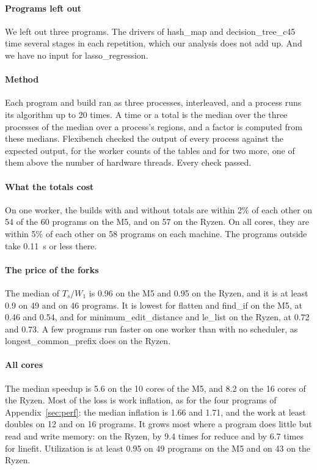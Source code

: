 \documentclass[sigplan,nonacm]{acmart}
\begin{document}
\paragraph{Programs left out}
%
We left out three programs.
%
The drivers of hash\_map and decision\_tree\_c45 time several stages
in each repetition, which our analysis does not add up.
%
And we have no input for lasso\_regression.

\paragraph{Method}
%
Each program and build ran as three processes, interleaved, and a
process runs its algorithm up to 20 times.
%
A time or a total is the median over the three processes of the median
over a process's regions, and a factor is computed from these medians.
%
Flexibench checked the output of every process against the expected
output, for the worker counts of the tables and for two more, one of
them above the number of hardware threads.
%
Every check passed.

\paragraph{What the totals cost}
%
On one worker, the builds with and without totals are within 2\% of
each other on 54 of the 60 programs on the M5, and on 57 on the Ryzen.
%
On all cores, they are within 5\% of each other on 58 programs on each
machine.
%
The programs outside take 0.11~s or less there.

\paragraph{The price of the forks}
%
The median of $T_s/W_1$ is 0.96 on the M5 and 0.95 on the Ryzen, and
it is at least 0.9 on 49 and on 46 programs.
%
It is lowest for flatten and find\_if on the M5, at 0.46 and 0.54, and
for minimum\_edit\_distance and le\_list on the Ryzen, at 0.72 and
0.73.
%
A few programs run faster on one worker than with no scheduler, as
longest\_common\_prefix does on the Ryzen.

\paragraph{All cores}
%
The median speedup is 5.6 on the 10 cores of the M5, and 8.2 on the
16 cores of the Ryzen.
%
Most of the loss is work inflation, as for the four programs of
Appendix~\ref{sec:perf}: the median inflation is 1.66 and 1.71, and
the work at least doubles on 12 and on 16 programs.
%
It grows most where a program does little but read and write memory:
on the Ryzen, by 9.4 times for reduce and by 6.7 times for linefit.
%
Utilization is at least 0.95 on 49 programs on the M5 and on 43 on
the Ryzen.
\end{document}
